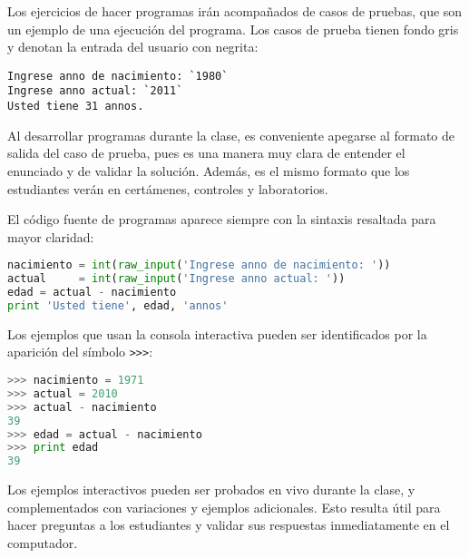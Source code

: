 \documentclass[12pt,spanish]{article}
\begin{document}
  Los ejercicios de hacer programas
  irán acompañados de casos de pruebas,
  que son un ejemplo de una ejecución del programa.
  Los casos de prueba tienen fondo gris
  y denotan la entrada del usuario con negrita:%
  \begin{lstlisting}[language=testcase,linewidth=.6\textwidth]
Ingrese anno de nacimiento: `1980`
Ingrese anno actual: `2011`
Usted tiene 31 annos.
  \end{lstlisting}

  Al desarrollar programas durante la clase,
  es conveniente apegarse al formato de salida del caso de prueba,
  pues es una manera muy clara de entender el enunciado
  y de validar la solución.
  Además, es el mismo formato que los estudiantes verán
  en certámenes, controles y laboratorios.

  El código fuente de programas aparece siempre
  con la sintaxis resaltada para mayor claridad:
  \begin{lstlisting}[language=py,linewidth=.5\textwidth]
nacimiento = int(raw_input('Ingrese anno de nacimiento: '))
actual     = int(raw_input('Ingrese anno actual: '))
edad = actual - nacimiento
print 'Usted tiene', edad, 'annos'
  \end{lstlisting}

  Los ejemplos que usan la consola interactiva
  pueden ser identificados por
  la aparición del símbolo \verb!>>>!:
  \begin{lstlisting}[language=py,linewidth=.5\textwidth]
>>> nacimiento = 1971
>>> actual = 2010
>>> actual - nacimiento
39
>>> edad = actual - nacimiento
>>> print edad
39
  \end{lstlisting}

  Los ejemplos interactivos pueden ser probados
  en vivo durante la clase,
  y complementados con variaciones y ejemplos adicionales.
  Esto resulta útil para hacer preguntas a los estudiantes
  y validar sus respuestas inmediatamente en el computador.
\end{document}
